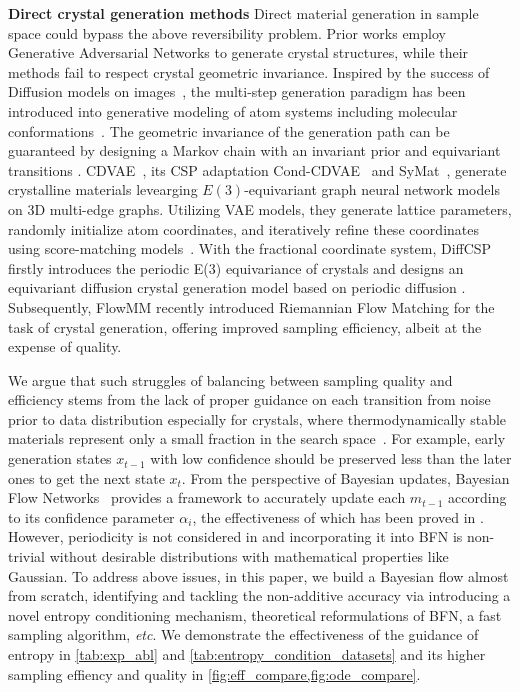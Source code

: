 \textbf{Direct crystal generation methods} Direct material generation in sample space could bypass the above reversibility problem. Prior works \citep{nouira2018crystalgan,kim2020generative} employ Generative Adversarial Networks \citep{goodfellow2020generative} to generate crystal structures, while their methods fail to respect crystal geometric invariance. Inspired by the success of Diffusion models on images~\citep{ho2020denoising,song2020score,song2019generative}, the multi-step generation paradigm has been introduced into generative modeling of atom systems including molecular conformations~\citep{xu2023geometric}. The geometric invariance of the generation path can be guaranteed by designing a Markov chain with an invariant prior and equivariant transitions \citep{xu2021geodiff}. CDVAE~\citep{xie2021crystal}, its CSP adaptation Cond-CDVAE~\citep{luo2024deep} and SyMat~\citep{luo2024towards}, generate crystalline materials levearging $E(3)$-equivariant graph neural network models~\citep{klipfel2023unified,gasteiger2021gemnet} on 3D multi-edge graphs. Utilizing VAE models, they generate lattice parameters, randomly initialize atom coordinates, and iteratively refine these coordinates using score-matching models~\cite{song2019generative}. With the fractional coordinate system, DiffCSP \citep{jiao2023crystal} firstly introduces the periodic E(3) equivariance of crystals and designs an equivariant diffusion crystal generation model based on periodic diffusion \citep{jing2022torsional}. Subsequently, FlowMM \citep{flowmm} recently introduced Riemannian Flow Matching \citep{riemannianfm} for the task of crystal generation, offering improved sampling efficiency, albeit at the expense of quality.

We argue that such struggles of balancing between sampling quality and efficiency stems from the lack of proper guidance on each transition from noise prior to data distribution especially for crystals, where thermodynamically stable materials represent
only a small fraction in the search space~\citep{flowmm}. For example, early generation states $x_{t-1}$ with low confidence should be preserved less than the later ones to get the next state $x_{t}$. From the perspective of Bayesian updates, Bayesian Flow Networks~\citep{bfn} provides a framework to accurately update each $m_{t-1}$ according to its confidence parameter $\alpha_i$, the effectiveness of which has been proved in \citet{song2023unified}. However, periodicity is not considered in \citet{bfn} and incorporating it into BFN is non-trivial without desirable distributions with mathematical properties like Gaussian. To address above issues, in this paper, we build a Bayesian flow almost from scratch, identifying and tackling the non-additive accuracy via introducing a novel entropy conditioning mechanism, theoretical reformulations of BFN, a fast sampling algorithm, \emph{etc}. We demonstrate the effectiveness of the guidance of entropy in \cref{tab:exp_abl} and \cref{tab:entropy_condition_datasets} and its higher sampling effiency and quality in \cref{fig:eff_compare,fig:ode_compare}.

